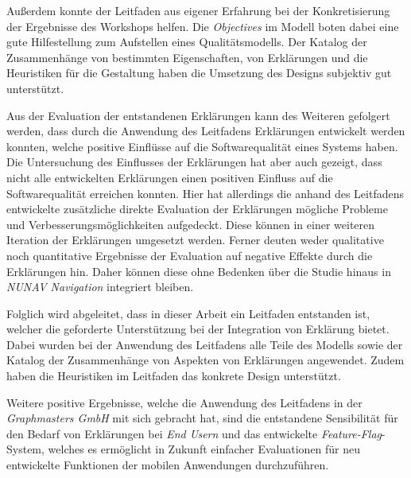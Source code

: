 Außerdem konnte der Leitfaden aus eigener Erfahrung bei der Konkretisierung der Ergebnisse des Workshops helfen. Die \textit{Objectives} im Modell boten dabei eine gute Hilfestellung zum Aufstellen eines Qualitätsmodells. Der Katalog der Zusammenhänge von bestimmten Eigenschaften, von Erklärungen und die Heuristiken für die Gestaltung haben die Umsetzung des Designs subjektiv gut unterstützt.

Aus der Evaluation der entstandenen Erklärungen kann des Weiteren gefolgert werden, dass durch die Anwendung des Leitfadens Erklärungen entwickelt werden konnten, welche positive Einflüsse auf die Softwarequalität eines Systems haben. Die Untersuchung des Einflusses der Erklärungen hat aber auch gezeigt, dass nicht alle entwickelten Erklärungen einen positiven Einfluss auf die Softwarequalität erreichen konnten. Hier hat allerdings die anhand des Leitfadens entwickelte zusätzliche direkte Evaluation der Erklärungen mögliche Probleme und Verbesserungsmöglichkeiten aufgedeckt. Diese können in einer weiteren Iteration der Erklärungen umgesetzt werden. Ferner deuten weder qualitative noch quantitative Ergebnisse der Evaluation auf negative Effekte durch die Erklärungen hin. Daher können diese ohne Bedenken über die Studie hinaus in \textit{NUNAV Navigation} integriert bleiben.

Folglich wird abgeleitet, dass in dieser Arbeit ein Leitfaden entstanden ist, welcher die geforderte Unterstützung bei der Integration von Erklärung bietet. Dabei wurden bei der Anwendung des Leitfadens alle Teile des Modells sowie der Katalog der Zusammenhänge von Aspekten von Erklärungen angewendet. Zudem haben die Heuristiken im Leitfaden das konkrete Design unterstützt.

Weitere positive Ergebnisse, welche die Anwendung des Leitfadens in der \textit{Graphmasters GmbH} mit sich gebracht hat, sind die entstandene Sensibilität für den Bedarf von Erklärungen bei \textit{End Usern} und das entwickelte \textit{Feature-Flag}-System, welches es ermöglicht in Zukunft einfacher Evaluationen für neu entwickelte Funktionen der mobilen Anwendungen durchzuführen.